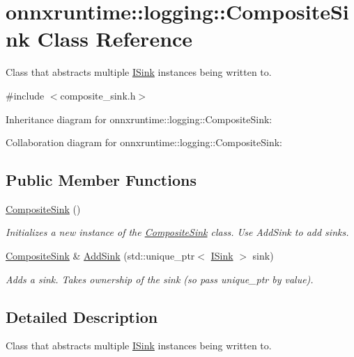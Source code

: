 \hypertarget{classonnxruntime_1_1logging_1_1CompositeSink}{}\section{onnxruntime\+:\+:logging\+:\+:Composite\+Sink Class Reference}
\label{classonnxruntime_1_1logging_1_1CompositeSink}


Class that abstracts multiple \mbox{\hyperlink{classonnxruntime_1_1logging_1_1ISink}{I\+Sink}} instances being written to.  




{\ttfamily \#include $<$composite\+\_\+sink.\+h$>$}



Inheritance diagram for onnxruntime\+:\+:logging\+:\+:Composite\+Sink\+:


Collaboration diagram for onnxruntime\+:\+:logging\+:\+:Composite\+Sink\+:
\subsection*{Public Member Functions}
\begin{DoxyCompactItemize}
\item 
\mbox{\hyperlink{classonnxruntime_1_1logging_1_1CompositeSink_a58da6e015bd64ab5ac42fa001066c0a0}{Composite\+Sink}} ()
\begin{DoxyCompactList}\small\item\em Initializes a new instance of the \mbox{\hyperlink{classonnxruntime_1_1logging_1_1CompositeSink}{Composite\+Sink}} class. Use Add\+Sink to add sinks. \end{DoxyCompactList}\item 
\mbox{\hyperlink{classonnxruntime_1_1logging_1_1CompositeSink}{Composite\+Sink}} \& \mbox{\hyperlink{classonnxruntime_1_1logging_1_1CompositeSink_ac3f7252d42270a2e837c6f7bb8ddd4af}{Add\+Sink}} (std\+::unique\+\_\+ptr$<$ \mbox{\hyperlink{classonnxruntime_1_1logging_1_1ISink}{I\+Sink}} $>$ sink)
\begin{DoxyCompactList}\small\item\em Adds a sink. Takes ownership of the sink (so pass unique\+\_\+ptr by value). \end{DoxyCompactList}\end{DoxyCompactItemize}


\subsection{Detailed Description}
Class that abstracts multiple \mbox{\hyperlink{classonnxruntime_1_1logging_1_1ISink}{I\+Sink}} instances being written to. 

